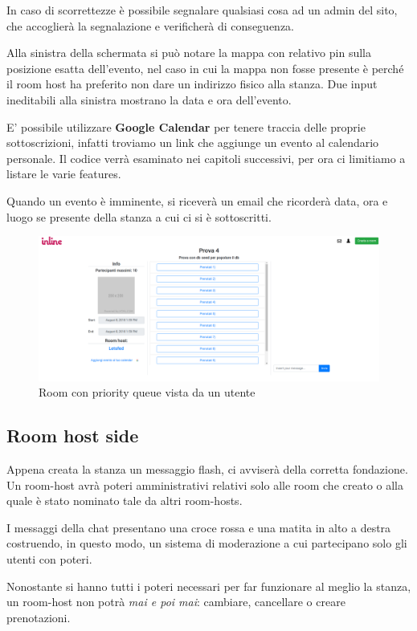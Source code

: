 	In caso di scorrettezze è possibile segnalare qualsiasi cosa ad un admin del sito, che accoglierà la segnalazione e verificherà di conseguenza.
	
	Alla sinistra della schermata si può notare la mappa con relativo pin sulla posizione esatta dell'evento, nel caso in cui la mappa non fosse presente è perché il room host ha preferito non dare un indirizzo fisico alla stanza. Due input ineditabili alla sinistra mostrano la data e ora dell'evento.
	
	E' possibile utilizzare \textbf{Google Calendar} per tenere traccia delle proprie sottoscrizioni, infatti troviamo un link che aggiunge un evento al calendario personale. Il codice verrà esaminato nei capitoli successivi, per ora ci limitiamo a listare le varie features.
	
	Quando un evento è imminente, si riceverà un email che ricorderà data, ora e luogo se presente della stanza a cui ci si è sottoscritti.
	
	\begin{figure}[H]
		\includegraphics[width=\columnwidth]{roomPQ.png}
		\caption{Room con priority queue vista da un utente}
	\end{figure}

	\subsection{Room host side}
	Appena creata la stanza un messaggio flash, ci avviserà della corretta fondazione. Un room-host avrà poteri amministrativi relativi solo alle room che creato o alla quale è stato nominato tale da altri room-hosts.
	
	I messaggi della chat presentano una croce rossa e una matita in alto a destra costruendo, in questo modo, un sistema di moderazione a cui partecipano solo gli utenti con poteri.
	
	Nonostante si hanno tutti i poteri necessari per far funzionare al meglio la stanza, un room-host non potrà \textit{mai e poi mai}: cambiare, cancellare o creare prenotazioni.
	
